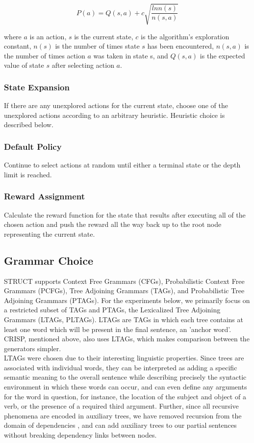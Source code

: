 $$P(a) = Q(s,a) + c\sqrt{\frac{ln n(s)}{n(s,a)}}$$

where $a$ is an action, $s$ is the current state, $c$ is the algorithm's exploration constant, $n(s)$ is the number of
times state $s$ has been encountered, $n(s,a)$ is the number of times action $a$ was taken in state s, and $Q(s,a)$ is
the expected value of state $s$ after selecting action $a$.

\subsubsection{State Expansion}
If there are any unexplored actions for the current state, choose one of the unexplored actions according to an
arbitrary heuristic. Heuristic choice is described below.

\subsubsection{Default Policy}
Continue to select actions at random until either a terminal state or the depth limit is reached.

\subsubsection{Reward Assignment}
Calculate the reward function for the state that results after executing all of the chosen action and push the reward
all the way back up to the root node representing the current state.

\subsection{Grammar Choice}

STRUCT supports Context Free Grammars (CFGs), Probabilistic Context Free Grammars (PCFGs), Tree Adjoining Grammars
(TAGs), and Probabilistic Tree Adjoining Grammars (PTAGs). For the experiments below, we primarily focus on a restricted
subset of TAGs and PTAGs, the Lexicalized Tree Adjoining Grammars (LTAGs, PLTAGs). LTAGs are TAGs in which each tree
contains at least one word which will be present in the final sentence, an 'anchor word'. CRISP, mentioned above, also
uses LTAGs, which makes comparison between the generators simpler.\\

LTAGs were chosen due to their interesting linguistic properties. Since trees are associated with individual words, they
can be interpreted as adding a specific semantic meaning to the overall sentence while describing precisely the
syntactic environment in which these words can occur, and can even define any arguments for the word in question, for
instance, the location of the subject and object of a verb, or the presence of a required third argument. Further, since
all recursive phenomena are encoded in auxiliary trees, we have removed recursion from the domain of dependencies
\cite{bauer2009statistical}, and can add auxiliary trees to our partial sentences without breaking dependency links
between nodes.

